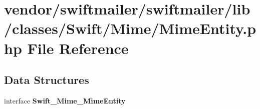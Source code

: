\section{vendor/swiftmailer/swiftmailer/lib/classes/\+Swift/\+Mime/\+Mime\+Entity.php File Reference}
\label{_mime_entity_8php}
\subsection*{Data Structures}
\begin{DoxyCompactItemize}
\item 
interface {\bf Swift\+\_\+\+Mime\+\_\+\+Mime\+Entity}
\end{DoxyCompactItemize}
